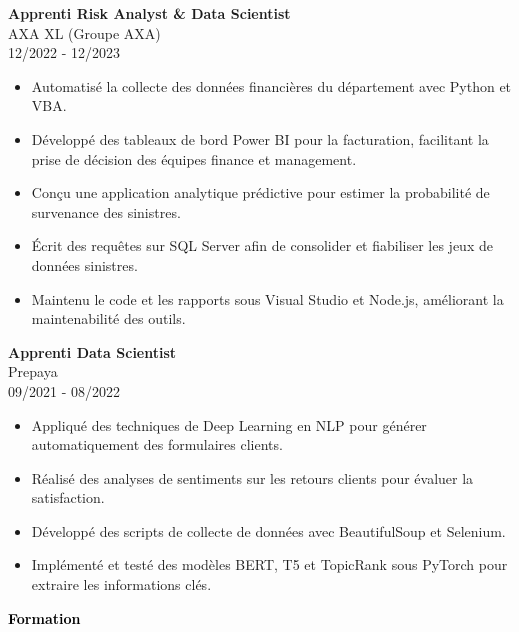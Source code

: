 \documentclass{article}
\begin{document}
\begin{paracol}{2}
\colorbox{maincolor}{%
  \begin{minipage}{\linewidth}
    \textbf{Apprenti Risk Analyst \& Data Scientist} \\ AXA XL (Groupe AXA) \\ 12/2022 - 12/2023
    \begin{itemize}
      \item Automatisé la collecte des données financières du département avec Python et VBA. \item Développé des tableaux de bord Power BI pour la facturation, facilitant la prise de décision des équipes finance et management. \item Conçu une application analytique prédictive pour estimer la probabilité de survenance des sinistres. \item Écrit des requêtes sur SQL Server afin de consolider et fiabiliser les jeux de données sinistres. \item Maintenu le code et les rapports sous Visual Studio et Node.js, améliorant la maintenabilité des outils.
    \end{itemize}
  \end{minipage}}

\vspace{3mm}


\colorbox{maincolor}{%
  \begin{minipage}{\linewidth}
    \textbf{Apprenti Data Scientist} \\ Prepaya \\ 09/2021 - 08/2022
    \begin{itemize}
      \item Appliqué des techniques de Deep Learning en NLP pour générer automatiquement des formulaires clients. \item Réalisé des analyses de sentiments sur les retours clients pour évaluer la satisfaction. \item Développé des scripts de collecte de données avec BeautifulSoup et Selenium. \item Implémenté et testé des modèles BERT, T5 et TopicRank sous PyTorch pour extraire les informations clés.
    \end{itemize}
  \end{minipage}}   %

\vspace{8mm}

\textcolor{black}{\Large \textbf{Formation}} \\[2pt]


\end{paracol}
\end{document}
